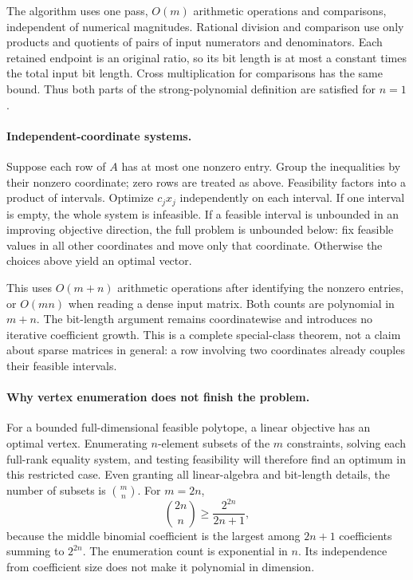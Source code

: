 \documentclass[11pt,a4paper]{article}
\begin{document}
The algorithm uses one pass, $O(m)$ arithmetic operations and comparisons, independent of numerical magnitudes. Rational division and comparison use only products and quotients of pairs of input numerators and denominators. Each retained endpoint is an original ratio, so its bit length is at most a constant times the total input bit length. Cross multiplication for comparisons has the same bound. Thus both parts of the strong-polynomial definition are satisfied for $n=1$.

\paragraph{Independent-coordinate systems.}
Suppose each row of $A$ has at most one nonzero entry. Group the inequalities by their nonzero coordinate; zero rows are treated as above. Feasibility factors into a product of intervals. Optimize $c_jx_j$ independently on each interval. If one interval is empty, the whole system is infeasible. If a feasible interval is unbounded in an improving objective direction, the full problem is unbounded below: fix feasible values in all other coordinates and move only that coordinate. Otherwise the choices above yield an optimal vector.

This uses $O(m+n)$ arithmetic operations after identifying the nonzero entries, or $O(mn)$ when reading a dense input matrix. Both counts are polynomial in $m+n$. The bit-length argument remains coordinatewise and introduces no iterative coefficient growth. This is a complete special-class theorem, not a claim about sparse matrices in general: a row involving two coordinates already couples their feasible intervals.

\paragraph{Why vertex enumeration does not finish the problem.}
For a bounded full-dimensional feasible polytope, a linear objective has an optimal vertex. Enumerating $n$-element subsets of the $m$ constraints, solving each full-rank equality system, and testing feasibility will therefore find an optimum in this restricted case. Even granting all linear-algebra and bit-length details, the number of subsets is $\binom mn$. For $m=2n$,
\[
\binom{2n}{n}\ge\frac{2^{2n}}{2n+1},
\]
because the middle binomial coefficient is the largest among $2n+1$ coefficients summing to $2^{2n}$. The enumeration count is exponential in $n$. Its independence from coefficient size does not make it polynomial in dimension.
\end{document}
